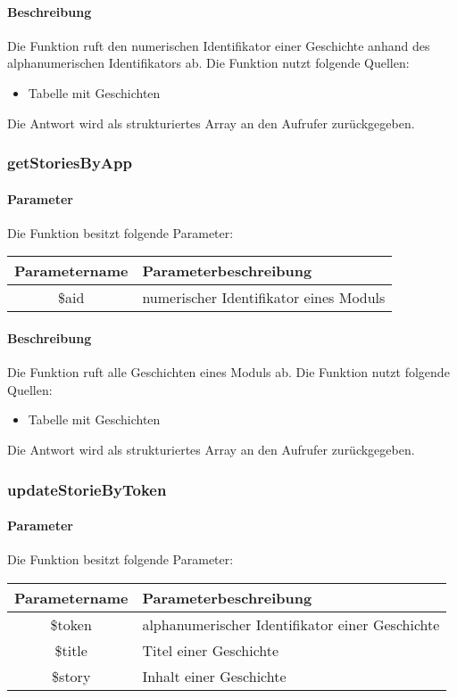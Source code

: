 \paragraph{Beschreibung} Die Funktion ruft den numerischen Identifikator einer Geschichte anhand des alphanumerischen Identifikators ab. Die Funktion nutzt folgende Quellen:
\begin{itemize}
	\item Tabelle mit Geschichten
\end{itemize}
Die Antwort wird als strukturiertes Array an den Aufrufer zurückgegeben.
\subsubsection{getStoriesByApp}
\paragraph{Parameter} Die Funktion besitzt folgende Parameter:
\begin{table}[H]
	\begin{tabular}{|c|p{11cm}|}
		\hline
		\textbf{Parametername} & \textbf{Parameterbeschreibung} \\ \hline
		\$aid & numerischer Identifikator eines Moduls \\ \hline
	\end{tabular}
\end{table}
\paragraph{Beschreibung} Die Funktion ruft alle Geschichten eines Moduls ab. Die Funktion nutzt folgende Quellen:
\begin{itemize}
	\item Tabelle mit Geschichten
\end{itemize}
Die Antwort wird als strukturiertes Array an den Aufrufer zurückgegeben.
\subsubsection{updateStorieByToken}
\paragraph{Parameter} Die Funktion besitzt folgende Parameter:
\begin{table}[H]
	\begin{tabular}{|c|p{11cm}|}
		\hline
		\textbf{Parametername} & \textbf{Parameterbeschreibung} \\ \hline
		\$token & alphanumerischer Identifikator einer Geschichte \\ \hline
		\$title & Titel einer Geschichte \\ \hline
		\$story & Inhalt einer Geschichte \\ \hline
	\end{tabular}
\end{table}
